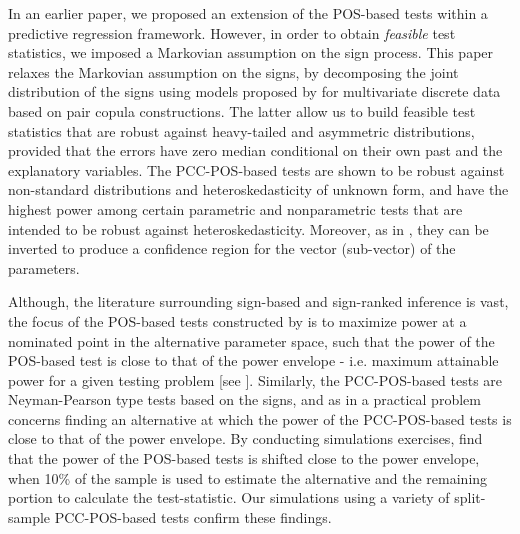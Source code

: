 \documentclass[harvard,11pt]{article}
\begin{document}
In an earlier paper, we proposed an extension of the POS-based tests within a predictive regression framework. However, in order to obtain \textit{feasible} test statistics, we imposed a Markovian assumption on the sign process. This paper relaxes the Markovian assumption on the signs, by decomposing the joint distribution of the signs using models proposed by \citet{panagiotelis2012pair} for multivariate discrete data based on pair copula constructions. The latter allow us to build feasible test statistics that are robust against heavy-tailed and asymmetric distributions, provided that the errors have zero median conditional on their own past and the explanatory variables. The PCC-POS-based tests are shown to be robust against non-standard distributions and heteroskedasticity of unknown form, and have the highest power among certain parametric and nonparametric tests that are intended to be robust against heteroskedasticity. Moreover, as in \citet{dufour2010exact}, they can be inverted to produce a confidence region for the vector (sub-vector) of the parameters.  

Although, the literature surrounding sign-based and sign-ranked inference is vast, the focus of the POS-based tests constructed by \citet{dufour2010exact} is to maximize power at a nominated point in the alternative parameter space, such that the power of the POS-based test is close to that of the power envelope - i.e. maximum attainable power for a given testing problem [see \citet{king1987towards}]. Similarly, the PCC-POS-based tests are Neyman-Pearson type tests based on the signs, and as in \citet{dufour2010exact} a practical problem concerns finding an alternative at which the power of the PCC-POS-based tests is close to that of the power envelope. By conducting simulations exercises, \citet{dufour2010exact} find that the power of the POS-based tests is shifted close to the power envelope, when 10\% of the sample is used to estimate the alternative and the remaining portion to calculate the test-statistic. Our simulations using a variety of split-sample PCC-POS-based tests confirm these findings.
\end{document}

